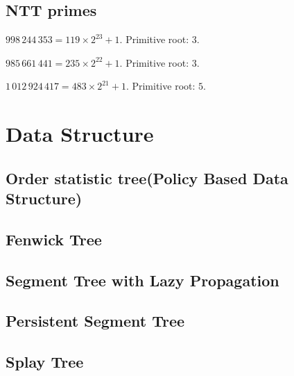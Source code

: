 \documentclass[8pt,landscape,a4paper,twocolumn]{article}
\begin{document}
\subsection{NTT primes}
$998\,244\,353 = 119 \times 2^{23} + 1$. Primitive root: $3$.

$985\,661\,441 = 235 \times 2^{22} + 1$. Primitive root: $3$.

$1\,012\,924\,417 = 483 \times 2^{21} + 1$. Primitive root: $5$.

\section{Data Structure}

\subsection{Order statistic tree(Policy Based Data Structure)}


\subsection{Fenwick Tree}


\subsection{Segment Tree with Lazy Propagation}


% 

\subsection{Persistent Segment Tree}


\subsection{Splay Tree}

\end{document}
